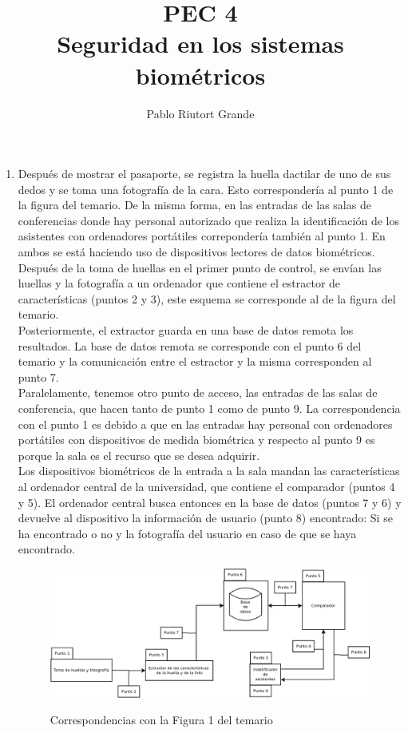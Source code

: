 \documentclass[10pt,a4paper]{article}
\author{Pablo Riutort Grande}
\title{PEC 4\\ \vspace{1cm}\textbf{Seguridad en los sistemas biométricos}}
\begin{document}
\maketitle
\pagebreak

\begin{enumerate}[label=\textbf{\alph*)}]
\item Después de mostrar el pasaporte, se registra la huella dactilar de uno de sus dedos y se toma una fotografía de la
cara. Esto correspondería al punto 1 de la figura del temario. De la misma forma, en las entradas de las salas de conferencias donde hay personal autorizado que realiza la identificación de los asistentes con ordenadores portátiles correpondería también al punto 1. En ambos se está haciendo uso de dispositivos lectores de datos biométricos.\\
Después de la toma de huellas en el primer punto de control, se envían las huellas y la fotografía a un ordenador que contiene el estractor de características (puntos 2 y 3), este esquema se corresponde al de la figura del temario.\\
Posteriormente, el extractor guarda en una base de datos remota los resultados. La base de datos remota se corresponde con el punto 6 del temario y la comunicación entre el estractor y la misma corresponden al punto 7.\\
Paralelamente, tenemos otro punto de acceso, las entradas de las salas de conferencia, que hacen tanto de punto 1 como de punto 9. La correspondencia con el punto 1 es debido a que en las entradas hay personal con ordenadores portátiles con dispositivos de medida biométrica y respecto al punto 9 es porque la sala es el recurso que se desea adquirir.\\
Los dispositivos biométricos de la entrada a la sala mandan las características al ordenador central de la universidad, que contiene el comparador (puntos 4 y 5). El ordenador central busca entonces en la base de datos (puntos 7 y 6) y devuelve al dispositivo la información de usuario (punto 8) encontrado: Si se ha encontrado o no y la fotografía del usuario en caso de que se haya encontrado.

\begin{figure}[h!]
  \centering
  \includegraphics[scale=0.4]{diagram.png}\\
  \caption{Correspondencias con la Figura 1 del temario}
  \label{fig:puntos}
\end{figure}


\end{enumerate}
\end{document}

